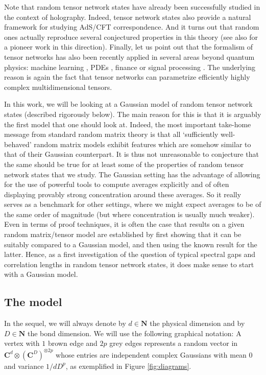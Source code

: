 \documentclass{amsart}
\newcommand{\N}{\mathbf{N}}
\newcommand{\C}{\mathbf{C}}
\begin{document}
Note that random tensor network states have already been successfully studied in the context of holography. Indeed, tensor network states also provide a natural framework for studying AdS/CFT correspondence. And it turns out that random ones actually reproduce several conjectured properties in this theory \cite{HNQTWY} (see also \cite{Has2} for a pioneer work in this direction). Finally, let us point out that the formalism of tensor networks has also been recently applied in several areas beyond quantum physics: machine learning \cite{Carleo19, Cichoki17b}, PDEs \cite{Bachmayr16, Garcia-Ripoll19}, finance \cite{Mugel20} or signal processing \cite{Garcia-Ripoll19}. The underlying reason is again the fact that tensor networks can parametrize efficiently highly complex multidimensional tensors.

In this work, we will be looking at a Gaussian model of random tensor network states (described rigorously below). The main reason for this is that it is arguably the first model that one should look at. Indeed, the most important take-home message from standard random matrix theory is that all `sufficiently well-behaved' random matrix models exhibit features which are somehow similar to that of their Gaussian counterpart. It is thus not unreasonable to conjecture that the same should be true for at least some of the properties of random tensor network states that we study. The Gaussian setting has the advantage of allowing for the use of powerful tools to compute averages explicitly and of often displaying provably strong concentration around these averages. So it really serves as a benchmark for other settings, where we might expect averages to be of the same order of magnitude (but where concentration is usually much weaker). Even in terms of proof techniques, it is often the case that results on a given random matrix/tensor model are established by first showing that it can be suitably compared to a Gaussian model, and then using the known result for the latter. Hence, as a first investigation of the question of typical spectral gaps and correlation lengths in random tensor network states, it does make sense to start with a Gaussian model.

\subsection{The model} \hfill\par\smallskip

In the sequel, we will always denote by $d\in\N$ the physical dimension and by $D\in\N$ the bond dimension. We will use the following graphical notation: A vertex with $1$ brown edge and $2p$ grey edges represents a random vector in $\C^d\otimes(\C^D)^{\otimes 2p}$ whose entries are independent complex Gaussians with mean $0$ and variance $1/dD^p$, as exemplified in Figure \ref{fig:diagrams}.
\end{document}
